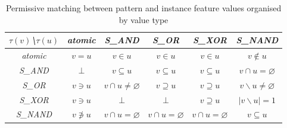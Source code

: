     \begin{table}[!ht]
        \centering
        \begin{tabular}{|c|c|c|c|c|c|}
            \hline
            \textit{$\tau(v)$\textbackslash $\tau(u)$} & \textit{atomic} & \textit{S_{AND}}                 & \textit{S_{OR}}              & \textit{S_{XOR}}             & \textit{S_{NAND}}            \\ \hline
            \textit{atomic}             & $v=u$             & $v \in u$                         & $v \in u$                          & $v \in u$                          & $v \notin u$                   \\ \hline
            \textit{S_{AND}}              & $\bot$               & $v \subseteq u$                     & $v \subseteq u$                          & $v \subseteq u$                          & $v \cap u = \varnothing$ \\ \hline
            \textit{S_{OR}}               & $v \ni u$          & $ v \cap u \neq \varnothing $ &                        $v \supseteq u $              & $v \supseteq u $   & $v \backslash u \neq \varnothing$ \\ \hline
            \textit{S_{XOR}}              & $v \ni u$          & $\bot$                              & $\bot$                        & $v \supseteq u$             & $ |v \backslash u| = 1$ \\ \hline
            \textit{S_{NAND}}             & $v \not\ni u$      & $v \cap u = \varnothing$     & $v \cap u = \varnothing$ & $v \cap u = \varnothing$ & $ v \subseteq u $                          \\ \hline
        \end{tabular}
        \caption{Permissive matching between pattern and instance feature values organised by value type}
        \label{tab:permissive}
    \end{table}


